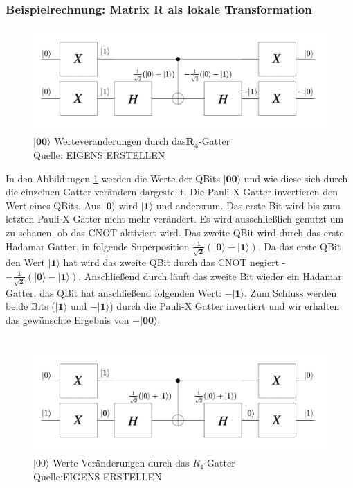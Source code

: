 \subsubsection{Beispielrechnung: Matrix R als lokale Transformation}
 \begin{figure}[hbtp]
	\centering
	\includegraphics[width=.8\textwidth]{figures/RGatter00.png}
	\caption{$\mathbf{|00\rangle}$ Werteveränderungen durch das$\mathbf{R_4}$-Gatter \\ Quelle: EIGENS ERSTELLEN}
	\label{fig:Rgatter00}
\end{figure}
 In den Abbildungen \ref{fig:Rgatter00} werden die Werte der QBits $\mathbf{|00\rangle}$ und wie diese sich durch die einzelnen Gatter verändern dargestellt.
 Die Pauli X Gatter invertieren den Wert eines QBits. Aus $\mathbf{|0\rangle}$ wird $\mathbf{|1\rangle}$ und andersrum. Das erste Bit wird bis zum letzten Pauli-X Gatter nicht mehr verändert. Es wird ausschließlich genutzt um zu schauen, ob das CNOT aktiviert wird. Das zweite QBit wird durch das erste Hadamar Gatter, in folgende Superposition $\mathbf{\frac{1}{\sqrt 2}(|0\rangle - |1\rangle)}$. Da das erste QBit den Wert $\mathbf{|1\rangle}$ hat wird das zweite QBit durch das CNOT negiert - $\mathbf{-\frac{1}{\sqrt 2}(|0\rangle - |1\rangle)}$. Anschließend durch läuft das zweite Bit wieder ein Hadamar Gatter, das QBit hat anschließend folgenden Wert: $\mathbf{-|1\rangle}$.
 Zum Schluss werden beide Bits ($\mathbf{|1\rangle}$ und $\mathbf{-|1\rangle}$) durch die Pauli-X Gatter invertiert und wir erhalten das gewünschte Ergebnis von $\mathbf{-|00\rangle}$.
  \\
  \\
   \begin{figure}[hbtp]
  	\centering
  	\includegraphics[width=.8\textwidth]{figures/RGatter01.png}
  	\caption{$|00\rangle$ Werte Veränderungen durch das $R_4$-Gatter \\ Quelle:EIGENS ERSTELLEN}
  	\label{fig:Rgatter01}
  \end{figure}

